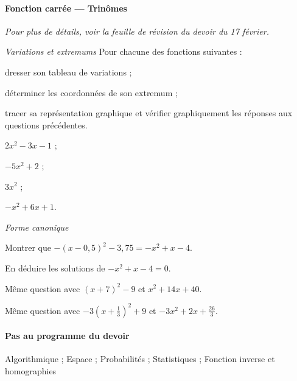 \documentclass[10pt]{article}
\begin{document}
\paragraph{Fonction carrée --- Trinômes}
\emph{Pour plus de détails, voir la feuille de révision du devoir du 17 février.}

\begin{compactenum}
\item \emph{Variations et extremums}
    Pour chacune des fonctions suivantes :
    \begin{compactenum}
      \item dresser son tableau de variations ;
      \item déterminer les coordonnées de son extremum ;
      \item tracer sa représentation graphique et vérifier graphiquement les réponses aux questions précédentes.
    \end{compactenum}
    \begin{inparaenum}[(a)]
    \item $2x^2-3x-1$ ;
    \item $-5x^2+2$ ;
    \item $3x^2$ ;
    \item $-x^2+6x+1$.
    \end{inparaenum}
  \item \emph{Forme canonique}
  \begin{compactenum}
    \item
      \begin{compactenum}
        \item Montrer que $-(x-0,5)^2-3,75=-x^2+x-4$.
        \item En déduire les solutions de $-x^2+x-4=0$.
      \end{compactenum}
    \item Même question avec $(x+7)^2-9$ et $x^2+14x+40$.
    \item Même question avec $-3(x+\frac{1}{3})^2+9$ et $-3x^2+2x+\frac{26}{3}$.
  \end{compactenum}
\end{compactenum}

\paragraph{Pas au programme du devoir}

Algorithmique ; Espace ; Probabilités ; Statistiques ; Fonction inverse et homographies
\end{document}
